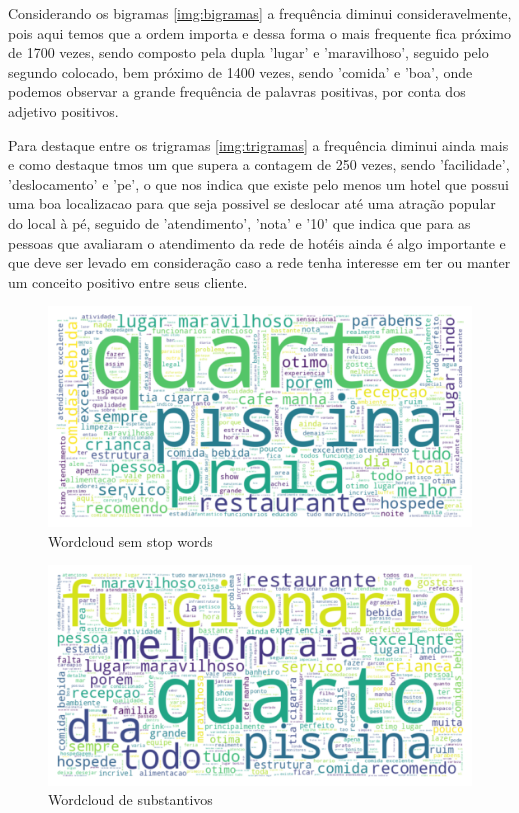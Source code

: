 Considerando os bigramas \ref{img:bigramas} a frequência diminui consideravelmente, pois aqui temos que a ordem importa e dessa forma o mais frequente fica próximo de 1700 vezes, sendo composto pela dupla 'lugar' e 'maravilhoso', seguido pelo segundo colocado, bem próximo de 1400 vezes, sendo 'comida' e 'boa', onde podemos observar a grande frequência de palavras positivas, por conta dos adjetivo positivos.

Para destaque entre os trigramas \ref{img:trigramas} a frequência diminui ainda mais e como destaque tmos um que supera a contagem de 250 vezes, sendo 'facilidade', 'deslocamento' e 'pe', o que nos indica que existe pelo menos um hotel que possui uma boa localizacao para que seja possivel se deslocar até uma atração popular do local à pé, seguido de 'atendimento', 'nota' e '10' que indica que para as pessoas que avaliaram o atendimento da rede de hotéis ainda é algo importante e que deve ser levado em consideração caso a rede tenha interesse em ter ou manter um conceito positivo entre seus cliente.


\begin{figure}
	\centering
	\includegraphics[width=1\textwidth]{figs/exploratoria/wordcloud_geral.png}
	\caption{Wordcloud sem stop words}
	\label{img:wordcloud_geral}
\end{figure}


\begin{figure}
	\centering
	\includegraphics[width=1\textwidth]{figs/exploratoria/wordcloud_substantivos.png}
	\caption{Wordcloud de substantivos}
	\label{img:wordcloud_substantivos}
\end{figure}

